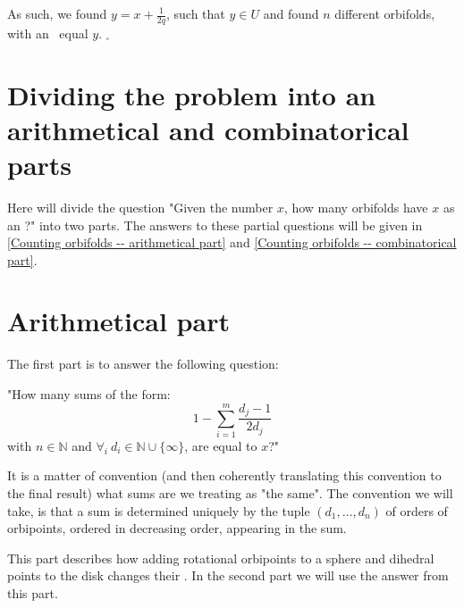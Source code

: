 As such, we found $y = x + \frac{1}{2q}$, such that $y \in U$ and 
found $n$
different orbifolds, with an \Eoc\ equal $y$. $_\square$ 
 



\section{Dividing the problem into an arithmetical and combinatorical parts}
\label{dividing the problem}
Here will divide the question "Given the number $x$, how many orbifolds have $x$ as an \Eoc?" 
into two parts. The answers to these partial questions will be given in 
\ref{Counting orbifolds -- arithmetical part} and 
\ref{Counting orbifolds -- combinatorical part}.   
\section{Arithmetical part}\label{arithmetical part}
The first part is to answer the following question:

"How many sums of the form:
\begin{equation}\label{counting D2}
1-\sum_{i=1}^m \frac{d_j-1}{2d_j} 
\end{equation} 
with $n\in \mathbb{N}$ and $\forall_i\ d_i\in\mathbb{N}\cup\{\infty\}$, are equal to $x$?"

It is a matter of convention (and then coherently translating this convention to the final result) 
what sums are we treating as "the same". The convention we will take, is that a sum is determined 
uniquely by the tuple $(d_1,\dots,d_n)$ 
of orders 
of orbipoints, ordered in decreasing order, appearing in the sum. 

This part describes how adding rotational orbipoints to a sphere and dihedral points 
to the disk changes their \Eoc. 
In the second part we will use the answer from this part.
